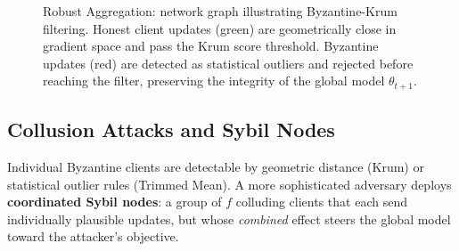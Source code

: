 \begin{figure}[t]
\caption{Robust Aggregation: network graph illustrating Byzantine-Krum filtering.
         Honest client updates (green) are geometrically close in gradient space
         and pass the Krum score threshold. Byzantine updates (red) are detected
         as statistical outliers and rejected before reaching the filter,
         preserving the integrity of the global model $\theta_{t+1}$.}
\label{fig:ch10_robust}
\end{figure}

\subsection{Collusion Attacks and Sybil Nodes}
\label{subsec:collusion_attacks}

Individual Byzantine clients are detectable by geometric distance (Krum) or statistical outlier rules (Trimmed Mean). A more sophisticated adversary deploys \textbf{coordinated Sybil nodes}: a group of $f$ colluding clients that each send individually plausible updates, but whose \emph{combined} effect steers the global model toward the attacker's objective.

